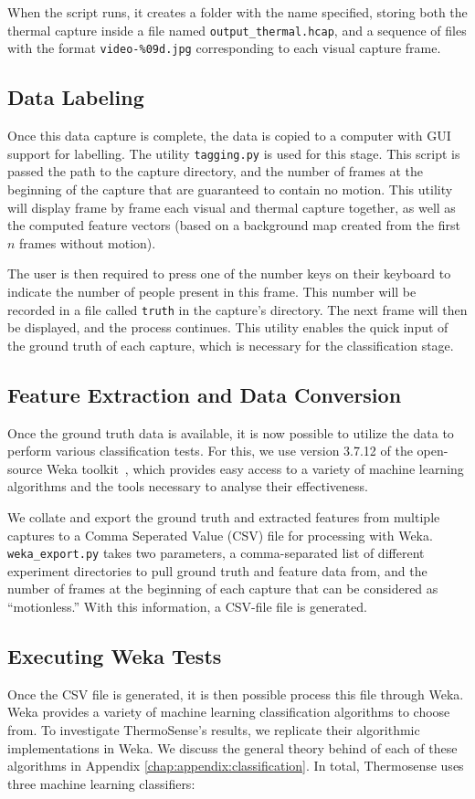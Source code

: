 \documentclass[../thesis/thesis.tex]{subfiles}
\begin{document}
When the script runs, it creates a folder with the name specified, storing both the thermal capture inside a file named \texttt{output\_thermal.hcap}, and a sequence of files with the format \texttt{video-\%09d.jpg} corresponding to each visual capture frame.

\subsection{Data Labeling}
\label{subsec:datalabelling}
Once this data capture is complete, the data is copied to a computer with GUI support for labelling. The utility \texttt{tagging.py} is used for this stage. This script is passed the path to the capture directory, and the number of frames at the beginning of the capture that are guaranteed to contain no motion. This utility will display frame by frame each visual and thermal capture together, as well as the computed feature vectors (based on a background map created from the first $n$ frames without motion).

The user is then required to press one of the number keys on their keyboard to indicate the number of people present in this frame. This number will be recorded in a file called \texttt{truth} in the capture's directory. The next frame will then be displayed, and the process continues. This utility enables the quick input of the ground truth of each capture, which is necessary for the classification stage.

\subsection{Feature Extraction and Data Conversion}
Once the ground truth data is available, it is now possible to utilize the data to perform various classification tests. For this, we use version 3.7.12 of the open-source Weka toolkit~\cite{Weka}, which provides easy access to a variety of machine learning algorithms and the tools necessary to analyse their effectiveness.

We collate and export the ground truth and extracted features from multiple captures to a Comma Seperated Value (CSV) file for processing with Weka. \texttt{weka\_export.py} takes two parameters, a comma-separated list of different experiment directories to pull ground truth and feature data from, and the number of frames at the beginning of each capture that can be considered as ``motionless.'' With this information, a CSV-file file is generated.

\subsection{Executing Weka Tests}
Once the CSV file is generated, it is then possible process this file through Weka. Weka provides a variety of machine learning classification algorithms to choose from. To investigate ThermoSense's results, we replicate their algorithmic implementations in Weka. We discuss the general theory behind of each of these algorithms in Appendix \ref{chap:appendix:classification}. In total, Thermosense uses three machine learning classifiers:
\end{document}
